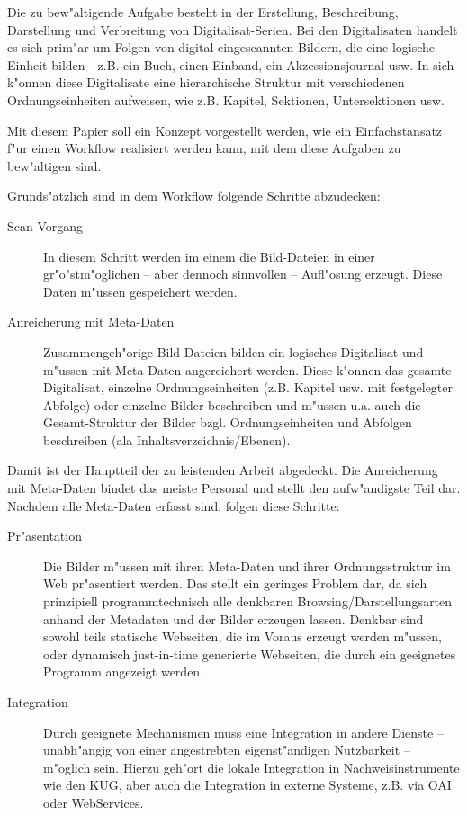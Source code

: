 \documentclass[11pt, twoside, a4paper, BCOR8mm, DIV12, bibtotoc,idxtotoc]{scrreprt}
\begin{document}
Die zu bew"altigende Aufgabe besteht in der Erstellung, Beschreibung,
Darstellung und Ver\-brei\-tung von Digitalisat-Serien. Bei den
Digitalisaten handelt es sich prim"ar um Folgen von digital
ein\-ge\-scann\-ten Bildern, die eine logische Einheit bilden - z.B. ein
Buch, einen Einband, ein Akzessions\-jour\-nal usw. In sich k"onnen diese
Digitalisate eine hierarchische Struktur mit verschiedenen
Ord\-nungs\-einheiten aufweisen, wie z.B. Kapitel, Sektionen,
Untersektionen usw.

Mit diesem Papier soll ein Konzept vorgestellt werden, wie ein
Einfachstansatz f"ur einen Workflow realisiert werden kann, mit dem
diese Aufgaben zu bew"altigen sind.

Grunds"atzlich sind in dem Workflow folgende Schritte abzudecken:

\begin{description}
\item[Scan-Vorgang] In diesem Schritt werden im einem die
  Bild-Dateien in einer gr"o"stm"oglichen -- aber dennoch sinnvollen
  -- Aufl"osung erzeugt. Diese Daten m"ussen gespeichert werden.
\item[Anreicherung mit Meta-Daten] Zusammengeh"orige Bild-Dateien
  bilden ein logisches Digitalisat und m"ussen mit Meta-Daten
  angereichert werden.  Diese k"onnen das gesamte Digitalisat,
  einzelne Ordnungs\-einheiten (z.B. Kapitel usw. mit festgelegter
  Abfolge) oder einzelne Bilder beschreiben und m"ussen u.a. auch die
  Gesamt-Struktur der Bilder bzgl.  Ordnungseinheiten und Abfolgen
  beschreiben (ala Inhaltsverzeichnis/Ebe\-nen).
\end{description}

Damit ist der Hauptteil der zu leistenden Arbeit abgedeckt. Die
Anreicherung mit Meta-Daten bindet das meiste Personal und stellt den
aufw"andigste Teil dar. Nachdem alle Meta-Daten erfasst sind, folgen
diese Schritte:

\begin{description}
\item[Pr"asentation] Die Bilder m"ussen mit ihren Meta-Daten und ihrer
  Ordnungsstruktur im Web pr"asentiert werden. Das stellt ein geringes
  Problem dar, da sich prinzipiell programm\-tech\-nisch alle denkbaren
  Browsing/Darstellungsarten anhand der Metadaten und der Bilder
  erzeugen lassen. Denkbar sind sowohl teils statische Webseiten, die
  im Voraus erzeugt werden m"ussen, oder dynamisch just-in-time
  generierte Webseiten, die durch ein geeignetes Programm angezeigt
  werden.
\item[Integration] Durch geeignete Mechanismen muss eine Integration
  in andere Dienste -- unabh"angig von einer angestrebten
  eigenst"andigen Nutzbarkeit -- m"oglich sein. Hierzu geh"ort die
  lokale Integration in Nachweisinstrumente wie den KUG, aber auch die
  Integration in externe Systeme, z.B. via OAI oder WebServices.

\end{description}
\end{document}
